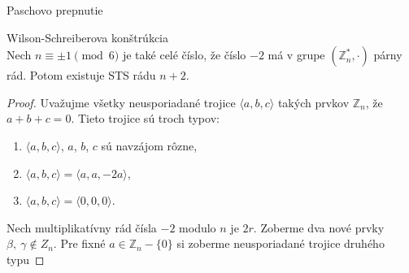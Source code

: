 \TODO Paschovo prepnutie

\begin{theorem}{Wilson-Schreiberova konštrúkcia}\\
	Nech $n \equiv \pm 1 \pmod6$ je také celé číslo, že číslo $-2$ má v grupe $(\mathbb{Z}^*_n, \cdot)$ párny rád. Potom existuje STS rádu $n + 2$.
\end{theorem}

\begin{proof}
	Uvažujme všetky neusporiadané trojice $\langle a, b, c \rangle$ takých prvkov $\mathbb{Z}_n$, že $a + b + c = 0$. Tieto trojice sú troch typov:
	\begin{enumerate}
		\item $\langle a, b, c \rangle$, $a$, $b$, $c$ sú navzájom rôzne,
		\item $\langle a, b, c \rangle = \langle a, a, -2a \rangle$,
		\item $\langle a, b, c \rangle = \langle 0, 0, 0 \rangle$.
	\end{enumerate}
	Nech multiplikatívny rád čísla $-2$ modulo $n$ je $2r$. Zoberme dva nové prvky $\beta,\ \gamma \notin Z_n$. Pre fixné $a \in \mathbb{Z}_n - \{0\}$ si zoberme neusporiadané trojice druhého typu
	

\end{proof}
